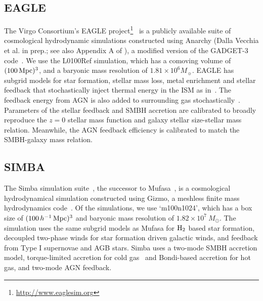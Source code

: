 \subsection{EAGLE} \label{sec:eagle} 
The Virgo Consortium's EAGLE
project\footnote{\url{http://www.eaglesim.org}}~\citep{schaye2015, crain2015,
mcalpine2016} is a publicly available suite of cosmological hydrodynamic
simulations constructed using {\sc Anarchy} (Dalla Vecchia et al. in prep.; 
see also Appendix A of \citealt{schaye2015}), a modified version of the 
{\sc GADGET-3} code~\citep{springel2005}. We use the L0100Ref simulation,
which has a comoving volume of $(100\,{\rm Mpc})^3$, and a baryonic mass resolution of $1.81\times 10^6M_{\sun}$. %
EAGLE has subgrid models for star formation, stellar mass loss, metal enrichment
and stellar feedback that stochastically inject thermal energy in the ISM as
in~\citep{dallavecchia2012}. The feedback energy from AGN is also added to
surrounding gas stochastically~\citep{booth2009}. Parameters of the stellar 
feedback and SMBH accretion are calibrated to broadly reproduce the $z=0$ 
stellar mass function and galaxy stellar size-stellar mass relation. Meanwhile, 
the AGN feedback efficiency is calibrated to match the SMBH-galaxy mass relation. 

\subsection{SIMBA} \label{sec:simba}
The {\sc Simba} simulation suite~\citep{dave2019}, the successor to {\sc
Mufasa}~\citep{dave2016, dave2017, dave2017a}, is a cosmological hydrodynamical
simulation constructed using {\sc Gizmo}, a meshless finite mass hydrodynamics 
code~\citep{hopkins2015, hopkins2017}. Of the simulations, we use
`m100n1024', which has a box size of $(100\,h^{-1}\,{\rm Mpc})^3$ and baryonic 
mass resolution of $1.82 \times 10^7\ M_\odot$. The simulation uses the same
subgrid models as {\sc Mufasa} for $\rm H_2$ based star formation, decoupled
two-phase winds for star formation driven galactic winds, and feedback from 
Type I supernovae and AGB stars. {\sc Simba} uses a two-mode SMBH accretion 
model, torque-limited accretion for cold gas~\citep{angles-alcazar2017} and 
Bondi-based accretion for hot gas, and two-mode AGN feedback. %

